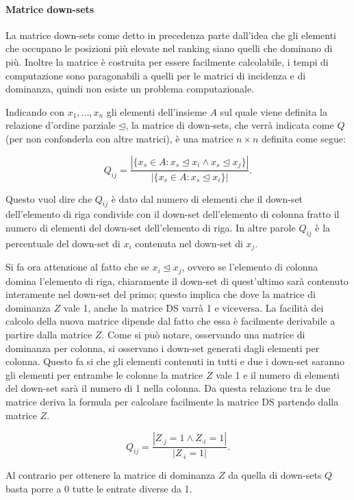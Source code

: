 \documentclass{report}
\begin{document}
\paragraph{Matrice down-sets}
La matrice down-sets come detto in precedenza parte dall'idea che gli elementi che occupano le posizioni più elevate nel ranking siano quelli che dominano di più. Inoltre la matrice è costruita per essere facilmente calcolabile, i tempi di computazione sono paragonabili a quelli per le matrici di incidenza e di dominanza, quindi non esiste un problema computazionale. 


Indicando con $x_1, ..., x_n$ gli elementi dell'insieme $A$ sul quale viene definita la relazione d’ordine parziale $\unlhd$, la matrice di down-sets, che verrà indicata come $Q$ (per non confonderla con altre matrici), è una matrice $n\times n$ definita come segue:

\[Q_{ij} = \frac{|\{x_s\in A:x_s\unlhd x_i \land x_s\unlhd x_j\}|}{|\{x_s\in A:x_s\unlhd x_i\}|}.\]

Questo vuol dire che $Q_{ij}$ è dato dal numero di elementi che il down-set dell'elemento di riga condivide con il down-set dell'elemento di colonna fratto il numero di elementi del down-set dell'elemento di riga. In altre parole $Q_{ij}$ è la percentuale del down-set di $x_i$ contenuta nel down-set di $x_j$.


Si fa ora attenzione al fatto che se $x_i\unlhd x_j$, ovvero se l'elemento di colonna domina l'elemento di riga, chiaramente il down-set di quest'ultimo sarà contenuto interamente nel down-set del primo; questo implica che dove la matrice di dominanza $Z$ vale 1, anche la matrice DS varrà 1 e viceversa.
La facilità dei calcolo della nuova matrice dipende dal fatto che essa è facilmente derivabile a partire dalla matrice $Z$. Come si può notare, osservando una matrice di dominanza per colonna, si osservano i down-set generati dagli elementi per colonna. Questo fa si che gli elementi contenuti in tutti e due i down-set saranno gli elementi per entrambe le colonne la matrice $Z$ vale 1 e il numero di elementi del down-set sarà il numero di 1 nella colonna. Da questa relazione tra le due matrice deriva la formula per calcolare facilmente la matrice DS partendo dalla matrice $Z$.

\[Q_{ij} = \frac{|Z_{\cdot j}=1 \land Z_{\cdot i}=1|}{|Z_{\cdot i}=1|}.\]

Al contrario per ottenere la matrice di dominanza $Z$ da quella di down-sets $Q$ basta porre a 0 tutte le entrate diverse da 1.
\end{document}
